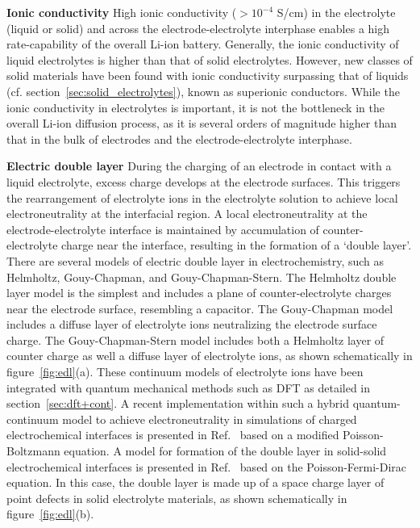 \documentclass[../main.tex]{subfiles}
\begin{document}
\textbf{Ionic conductivity} High ionic conductivity ($>10^{-4}$ S/cm) in the electrolyte (liquid or solid) and across the electrode-electrolyte interphase enables a high rate-capability of the overall Li-ion battery.\cite{park2010review,Kamaya2011} Generally, the ionic conductivity of liquid electrolytes is higher than that of solid electrolytes. However, new classes of solid materials have been found with ionic conductivity surpassing that of liquids (cf. section~\ref{sec:solid_electrolytes}), known as superionic conductors. While the ionic conductivity in electrolytes is important, it is not the bottleneck in the overall Li-ion diffusion process, as it is several orders of magnitude higher than that in the bulk of electrodes and the electrode-electrolyte interphase.\cite{park2010review}

\textbf{Electric double layer} During the charging of an electrode in contact with a liquid electrolyte, excess charge develops at the electrode surfaces. This triggers the rearrangement of electrolyte ions in the electrolyte solution to achieve local electroneutrality at the interfacial region. A local electroneutrality at the electrode-electrolyte interface is maintained by accumulation of counter-electrolyte charge near the interface, resulting in the formation of a `double layer'.\cite{Schmickler2010} There are several models of electric double layer in electrochemistry, such as Helmholtz, Gouy-Chapman, and Gouy-Chapman-Stern.\cite{Bard2010} The Helmholtz double layer model is the simplest and includes a plane of counter-electrolyte charges near the electrode surface, resembling a capacitor. The Gouy-Chapman model includes a diffuse layer of electrolyte ions neutralizing the electrode surface charge. The Gouy-Chapman-Stern model includes both a Helmholtz layer of counter charge as well a diffuse layer of electrolyte ions, as shown schematically in figure~\ref{fig:edl}(a). These continuum models of electrolyte ions have been integrated with quantum mechanical methods such as DFT as detailed in section~\ref{sec:dft+cont}. A recent implementation within such a hybrid quantum-continuum model to achieve electroneutrality in simulations of charged electrochemical interfaces is presented in Ref.~ based on a modified Poisson-Boltzmann equation. A model for formation of the double layer in solid-solid electrochemical interfaces is presented in Ref.~ based on the Poisson-Fermi-Dirac equation. In this case, the double layer is made up of a space charge layer of point defects in solid electrolyte materials, as shown schematically in figure~\ref{fig:edl}(b). 
\end{document}
